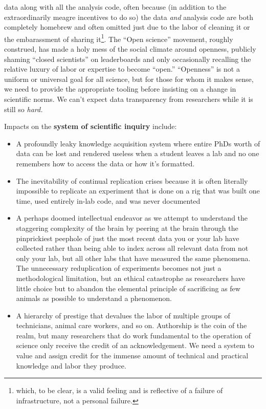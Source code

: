 \documentclass{article}
\begin{document}
\begin{itemize}
  data along with all the analysis code, often because (in addition to
  the extraordinarily meagre incentives to do so) the data \emph{and}
  analysis code are both completely homebrew and often omitted just due
  to the labor of cleaning it or the embarassment of sharing
  it\footnote{which, to be clear, is a valid feeling and is reflective
    of a failure of infrastructure, not a personal failure.}. The ``Open
  science'' movement, roughly construed, has made a holy mess of the
  social climate around openness, publicly shaming ``closed scientists''
  on leaderboards and only occasionally recalling the relative luxury of
  labor or expertise to become ``open.'' ``Openness'' is not a uniform
  or universal goal for all science, but for those for whom it makes
  sense, we need to provide the appropriate tooling before insisting on
  a change in scientific norms. We can't expect data transparency from
  researchers while it is still so \emph{hard.}
\end{itemize}

Impacts on the \textbf{system of scientific inquiry} include:

\begin{itemize}

\item
  A profoundly leaky knowledge acquisition system where entire PhDs
  worth of data can be lost and rendered useless when a student leaves a
  lab and no one remembers how to access the data or how it's formatted.
\item
  The inevitability of continual replication crises because it is often
  literally impossible to replicate an experiment that is done on a rig
  that was built one time, used entirely in-lab code, and was never
  documented
\item
  A perhaps doomed intellectual endeavor as we attempt to understand the staggering
  complexity of the brain by peering at the brain through the
  pinprickiest peephole of just the most recent data you or your lab
  have collected rather than being able to index across all relevant
  data from not only your lab, but all other labs that have measured the
  same phenomena. The unnecessary reduplication of experiments becomes
  not just a methodological limitation, but an ethical catastrophe as
  researchers have little choice but to abandon the elemental principle
  of sacrificing as few animals as possible to understand a phenomenon.
\item
  A hierarchy of prestige that devalues the labor of multiple groups of
  technicians, animal care workers, and so on. Authorship is the coin of
  the realm, but many researchers that do work fundamental to the
  operation of science only receive the credit of an acknowledgement. We
  need a system to value and assign credit for the immense amount of
  technical and practical knowledge and labor they produce.
\end{itemize}
\end{document}
